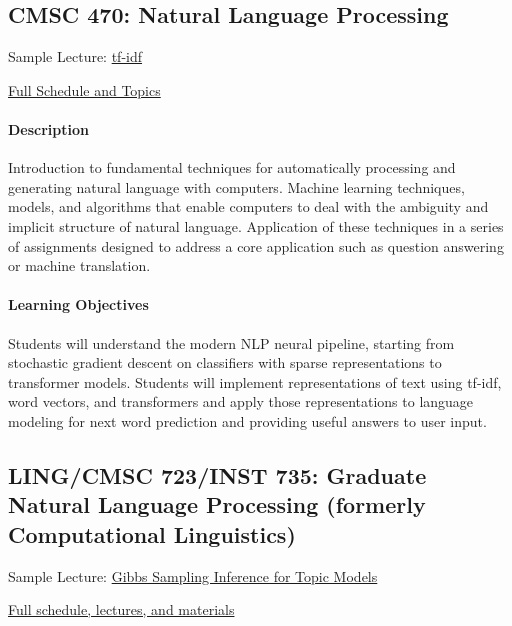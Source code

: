 \documentclass{article}
\begin{document}
  \subsection{CMSC 470: Natural Language Processing}

  \begin{itemize*}
  \item Sample Lecture: \href{https://www.youtube.com/watch?v=A5ounv0D_cs}{tf-idf}
    \item \href{https://users.umiacs.umd.edu/~jbg/teaching/CMSC_470/}{Full Schedule and Topics}
    \end{itemize*}
  
  \paragraph{Description}
Introduction to fundamental techniques for automatically processing and generating natural language with computers. Machine learning techniques, models, and algorithms that enable computers to deal with the ambiguity and implicit structure of natural language. Application of these techniques in a series of assignments designed to address a core application such as question answering or machine translation.

  \paragraph{Learning Objectives}
  Students will understand the modern NLP neural pipeline, starting from stochastic gradient descent on classifiers with sparse representations to transformer models.  Students will implement representations of text using tf-idf, word vectors, and transformers and apply those representations to language modeling for next word prediction and providing useful answers to user input.

  

  

\subsection{LING/CMSC 723/INST 735: Graduate Natural Language Processing (formerly Computational Linguistics)}

\begin{itemize*}
\item Sample Lecture: \href{https://www.youtube.com/watch?v=u7l5hhmdc0M}{Gibbs Sampling Inference for Topic Models}
  \item \href{http://users.umiacs.umd.edu/~jbg/teaching/CMSC_723/}{Full schedule, lectures, and materials}
\end{itemize*}
\end{document}

